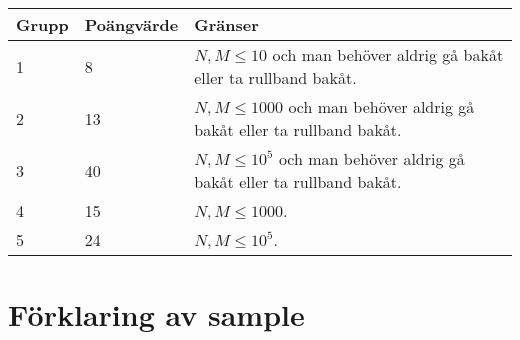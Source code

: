 \noindent
\begin{tabular}{| l | l | l |}
\hline
Grupp & Poängvärde & Gränser \\ \hline
1     & 8          &  $N,M \le 10$ och man behöver aldrig gå bakåt eller ta rullband bakåt.\\ \hline
2     & 13         &  $N,M \le 1000$ och man behöver aldrig gå bakåt eller ta rullband bakåt.\\ \hline
3     & 40         &  $N,M \le 10^5$ och man behöver aldrig gå bakåt eller ta rullband bakåt.\\ \hline
4     & 15         &  $N,M \le 1000$. \\ \hline
5     & 24         &  $N,M \le 10^5$. \\ \hline
\end{tabular}

\section*{Förklaring av sample}

